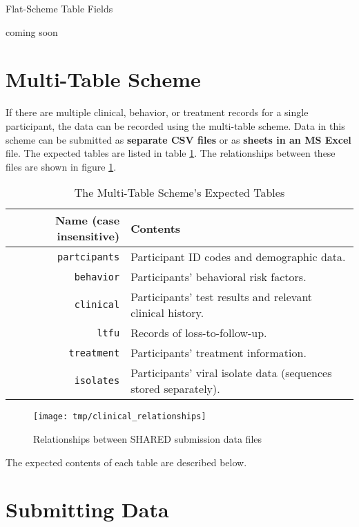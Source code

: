 \documentclass{article}
\begin{document}
\begin{table}
  \caption{Flat-Scheme Table Fields}
  \label{tbl:flat-scheme}
  coming soon
\end{table}


\section{Multi-Table Scheme}

If there are multiple clinical, behavior, or treatment records for a
single participant, the data can be recorded using the multi-table
scheme. Data in this scheme can be submitted as \textbf{separate CSV
  files} or as \textbf{sheets in an MS Excel} file. The expected
tables are listed in table \ref{tbl:multi-table-expected-tables}. The
relationships between these files are shown in figure
\ref{fig:relationships}.


\begin{table}[h!]
  \caption{The Multi-Table Scheme's Expected Tables}
  \label{tbl:multi-table-expected-tables}
  \begin{tabular}{rp{8cm}}
    Name (case insensitive) & Contents \\ \hline
    \verb|partcipants| & Participant ID codes and demographic data. \\
    \verb|behavior| &  Participants' behavioral risk factors. \\
    \verb|clinical| & Participants' test results and relevant clinical history. \\
    \verb|ltfu| & Records of loss-to-follow-up. \\
    \verb|treatment| &  Participants' treatment information. \\
    \verb|isolates| & Participants' viral isolate data (sequences stored separately). \\
  \end{tabular}
\end{table}

\begin{figure}
  \caption{Relationships between SHARED submission data files}
  \label{fig:relationships}
  \texttt{[image: tmp/clinical\_relationships]}
\end{figure}


The expected contents of each table are described below.





\section{Submitting Data}
\end{document}
